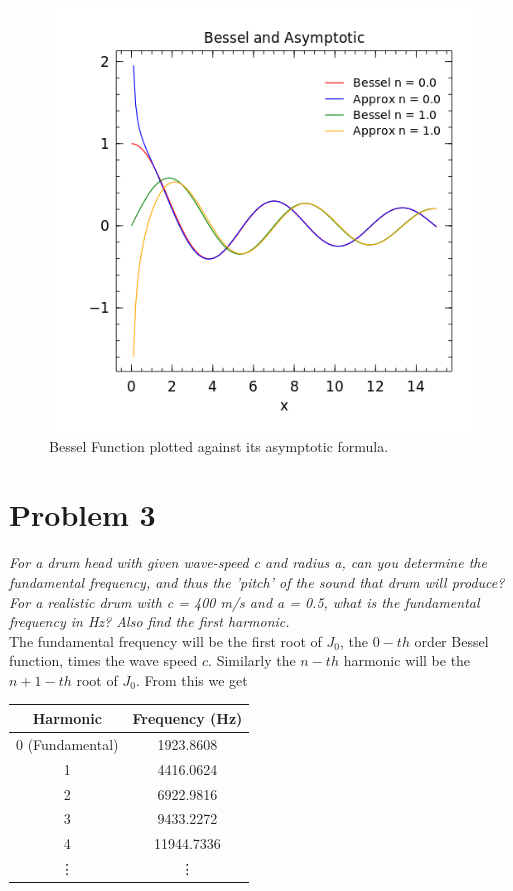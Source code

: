 \documentclass[12pt]{article}
\theoremstyle{remark}
\begin{document}
\begin{figure}[H]
	\centering
	\includegraphics[width=13cm]{HW11.png}
	\caption{Bessel Function plotted against its asymptotic formula.}
\end{figure}

\newpage

\section*{Problem 3}

\textit{For a drum head with given wave-speed c and radius a, can you determine the fundamental frequency, and thus the 'pitch' of the sound that drum will produce? For a realistic drum with c = 400 m/s and a = 0.5, what is the fundamental frequency in Hz? Also find the first harmonic.} \\

The fundamental frequency will be the first root of $J_0$, the 	$0-th$ order Bessel function, times the wave speed $c$. Similarly the $n-th$ harmonic will be the $n+1-th$ root of $J_0$. From this we get
\begin{center}
	\begin{tabular}{|c|c|}
		\hline
		\textbf{Harmonic} & \textbf{Frequency (Hz)} \\ \hline \hline
		0 (Fundamental) & 1923.8608 \\ \hline
		1 & 4416.0624 \\ \hline
		2 & 6922.9816 \\ \hline
		3 & 9433.2272 \\ \hline
		4 & 11944.7336 \\ \hline
		\vdots & \vdots \\ \hline
	\end{tabular}
\end{center}
\end{document}
